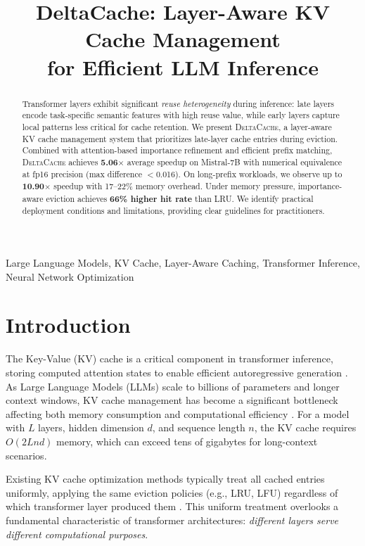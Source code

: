 \documentclass[10pt,conference]{IEEEtran}
\title{DeltaCache: Layer-Aware KV Cache Management\\for Efficient LLM Inference}
\author{\IEEEauthorblockN{Anonymous Authors}}
\newcommand{\deltacache}{\textsc{DeltaCache}}
\begin{document}
\maketitle

\begin{abstract}
Transformer layers exhibit significant \emph{reuse heterogeneity} during inference: late layers encode task-specific semantic features with high reuse value, while early layers capture local patterns less critical for cache retention. We present \deltacache{}, a layer-aware KV cache management system that prioritizes late-layer cache entries during eviction. Combined with attention-based importance refinement and efficient prefix matching, \deltacache{} achieves \textbf{5.06$\times$} average speedup on Mistral-7B with numerical equivalence at fp16 precision (max difference $<$0.016). On long-prefix workloads, we observe up to \textbf{10.90$\times$} speedup with 17--22\% memory overhead. Under memory pressure, importance-aware eviction achieves \textbf{66\% higher hit rate} than LRU. We identify practical deployment conditions and limitations, providing clear guidelines for practitioners.
\end{abstract}

\begin{IEEEkeywords}
Large Language Models, KV Cache, Layer-Aware Caching, Transformer Inference, Neural Network Optimization
\end{IEEEkeywords}

\section{Introduction}

The Key-Value (KV) cache is a critical component in transformer inference, storing computed attention states to enable efficient autoregressive generation \cite{vaswani2017attention}. As Large Language Models (LLMs) scale to billions of parameters and longer context windows, KV cache management has become a significant bottleneck affecting both memory consumption and computational efficiency \cite{kwon2023efficient}. For a model with $L$ layers, hidden dimension $d$, and sequence length $n$, the KV cache requires $O(2Lnd)$ memory, which can exceed tens of gigabytes for long-context scenarios.

Existing KV cache optimization methods typically treat all cached entries uniformly, applying the same eviction policies (e.g., LRU, LFU) regardless of which transformer layer produced them \cite{zhang2024h2o,snapkv2024}. This uniform treatment overlooks a fundamental characteristic of transformer architectures: \emph{different layers serve different computational purposes}.
\end{document}
